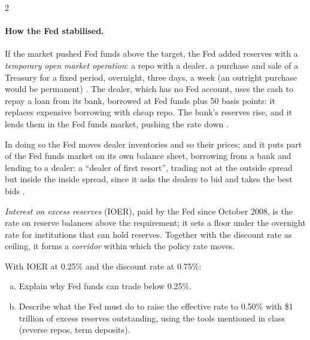 \begin{paracol}{2}
\paragraph{How the Fed stabilised.} If the market pushed Fed funds above the target, the Fed added reserves with a \emph{temporary open market operation}: a repo with a dealer, a
purchase and sale of a Treasury for a fixed period, overnight, three days, a week (an outright purchase would be permanent) . The
dealer, which has no Fed account, uses the cash to repay a loan from its bank, borrowed at Fed funds plus 50 basis points: it replaces expensive borrowing with cheap repo. The bank's
reserves rise, and it lends them in the Fed funds market, pushing the rate down .
\begin{taccts}
\quad
{}\quad
{}
\end{taccts}
In doing so the Fed moves dealer inventories and so their prices; and it puts part of the Fed funds market on its own balance sheet, borrowing from a bank and lending to a dealer: a
``dealer of first resort'', trading not at the outside spread but inside the inside spread, since it asks the dealers to bid and takes the best bids .

\begin{definition}
\emph{Interest on excess reserves} (IOER), paid by the Fed since October 2008, is the rate on reserve balances above the requirement; it sets a floor under the overnight rate for
institutions that can hold reserves. Together with the discount rate as ceiling, it forms a \emph{corridor} within which the policy rate moves.
\end{definition}

\begin{exercise}
With IOER at 0.25\% and the discount rate at 0.75\%:
\begin{enumerate}[(a)]
  \item Explain why Fed funds can trade below 0.25\%.
  \item Describe what the Fed must do to raise the effective rate to 0.50\% with \$1 trillion of excess reserves outstanding, using the tools mentioned in class (reverse repos,
        term deposits).
\end{enumerate}
\end{exercise}


\end{paracol}

